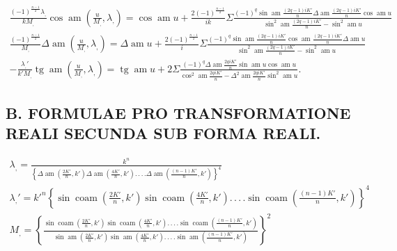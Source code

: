 \documentclass{article}
\begin{document}
\[
\begin{gathered}
\frac{(-1)^{\frac{n-1}{2}}\lambda_{,}}{kM_{,}}\cos\operatorname{am}\left(\frac{u}{M_{,}},\lambda_{,}\right)=\cos\operatorname{am}u+\frac{2(-1)^{\frac{n-1}{2}}}{ik}\Sigma\frac{(-1)^{q}\sin\operatorname{am}\frac{(2q-1)iK'}{n}\Delta\operatorname{am}\frac{(2q-1)iK'}{n}\cos\operatorname{am}u}{\sin^{2}\operatorname{am}\frac{(2q-1)iK'}{n}-\sin^{2}\operatorname{am}u}\\[2.5ex]
\frac{(-1)^{\frac{n-1}{2}}}{M_{,}}\Delta\operatorname{am}\left(\frac{u}{M_{,}},\lambda_{,}\right)=\Delta\operatorname{am}u+\frac{2(-1)^{\frac{n-1}{2}}}{i}\Sigma\frac{(-1)^{q}\sin\operatorname{am}\frac{(2q-1)iK'}{n}\cos\operatorname{am}\frac{(2q-1)iK'}{n}\Delta\operatorname{am}u}{\sin^{2}\operatorname{am}\frac{(2q-1)iK'}{n}-\sin^{2}\operatorname{am}u}\\[2.5ex]
-\frac{\lambda_{,}'}{k'M_{,}}\operatorname{tg}\operatorname{am}\left(\frac{u}{M_{,}},\lambda_{,}\right)=\operatorname{tg}\operatorname{am}u+2\Sigma\frac{(-1)^{q}\Delta\operatorname{am}\frac{2qiK'}{n}\sin\operatorname{am}u\cos\operatorname{am}u}{\cos^{2}\operatorname{am}\frac{2qiK'}{n}-\Delta^{2}\operatorname{am}\frac{2qiK'}{n}\sin^{2}\operatorname{am}u}.
\end{gathered}
\]

\subsection*{B. FORMULAE PRO TRANSFORMATIONE REALI SECUNDA SUB FORMA REALI.}

\[
\begin{gathered}
\lambda_{,}=\frac{k^{n}}{\left\{\Delta\operatorname{am}\left(\frac{2K'}{n},k'\right)\Delta\operatorname{am}\left(\frac{4K'}{n},k'\right).\,.\,.\,.\Delta\operatorname{am}\left(\frac{(n-1)K'}{n},k'\right)\right\}^{4}}\\[2.5ex]
\lambda_{,}'=k'^{n}\left\{\sin\operatorname{coam}\left(\frac{2K'}{n},k'\right)\sin\operatorname{coam}\left(\frac{4K'}{n},k'\right).\,.\,.\,.\sin\operatorname{coam}\left(\frac{(n-1)K'}{n},k'\right)\right\}^{4}\\[2.5ex]
M_{,}=\left\{\frac{\sin\operatorname{coam}\left(\frac{2K'}{n},k'\right)\sin\operatorname{coam}\left(\frac{4K'}{n},k'\right).\,.\,.\,.\sin\operatorname{coam}\left(\frac{(n-1)K'}{n},k'\right)}{\sin\operatorname{am}\left(\frac{2K'}{n},k'\right)\sin\operatorname{am}\left(\frac{4K'}{n},k'\right).\,.\,.\,.\sin\operatorname{am}\left(\frac{(n-1)K'}{n},k'\right)}\right\}^{2}
\end{gathered}
\]
\end{document}
